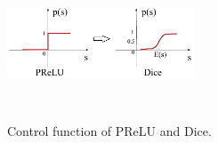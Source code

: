 \begin{figure}[!ht]
\centering
\includegraphics[height=1.8in, width=2.2in,keepaspectratio]{images/omni/dice_activation}
\caption{Control function of PReLU and Dice.}
\label{figure_dice}
\vspace{-0.4cm}
\end{figure} 


